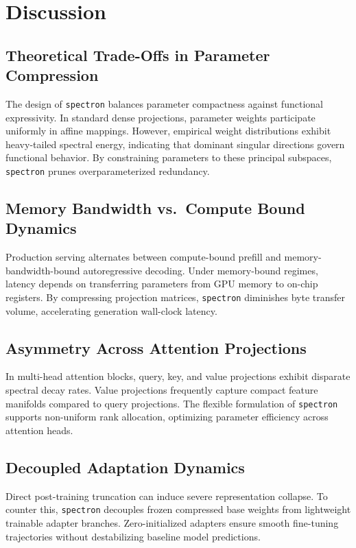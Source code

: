\section{Discussion}

\subsection{Theoretical Trade-Offs in Parameter Compression}
The design of \texttt{spectron} balances parameter compactness against functional expressivity. In standard dense projections, parameter weights participate uniformly in affine mappings. However, empirical weight distributions exhibit heavy-tailed spectral energy, indicating that dominant singular directions govern functional behavior. By constraining parameters to these principal subspaces, \texttt{spectron} prunes overparameterized redundancy.

\subsection{Memory Bandwidth vs.\ Compute Bound Dynamics}
Production serving alternates between compute-bound prefill and memory-bandwidth-bound autoregressive decoding. Under memory-bound regimes, latency depends on transferring parameters from GPU memory to on-chip registers. By compressing projection matrices, \texttt{spectron} diminishes byte transfer volume, accelerating generation wall-clock latency.

\subsection{Asymmetry Across Attention Projections}
In multi-head attention blocks, query, key, and value projections exhibit disparate spectral decay rates. Value projections frequently capture compact feature manifolds compared to query projections. The flexible formulation of \texttt{spectron} supports non-uniform rank allocation, optimizing parameter efficiency across attention heads.

\subsection{Decoupled Adaptation Dynamics}
Direct post-training truncation can induce severe representation collapse. To counter this, \texttt{spectron} decouples frozen compressed base weights from lightweight trainable adapter branches. Zero-initialized adapters ensure smooth fine-tuning trajectories without destabilizing baseline model predictions.

